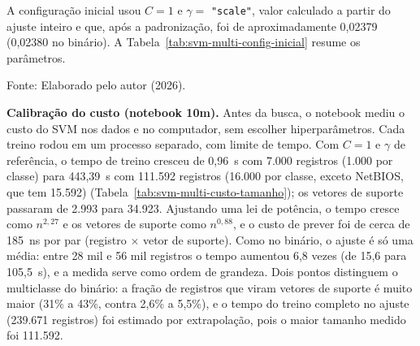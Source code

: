 \documentclass[
    12pt,                %
    openright,           %
    oneside,             %
    a4paper,             %
    english,             %
    brazil               %
]{abntex2}
\begin{document}
A configuração inicial usou $C = 1$ e $\gamma =$ \texttt{"scale"}, valor calculado a partir do ajuste inteiro e que, após a padronização, foi de aproximadamente 0,02379 (0,02380 no binário). A Tabela~\ref{tab:svm-multi-config-inicial} resume os parâmetros.
 
\begin{table}
\centering
\caption{Configuração inicial do SVM multiclasse}
\label{tab:svm-multi-config-inicial}
\par\smallskip
Fonte: Elaborado pelo autor (2026).
\end{table}
 
\textbf{Calibração do custo (notebook 10m).} Antes da busca, o notebook mediu o custo do SVM nos dados e no computador, sem escolher hiperparâmetros. Cada treino rodou em um processo separado, com limite de tempo. Com $C = 1$ e $\gamma$ de referência, o tempo de treino cresceu de 0,96~s com 7.000 registros (1.000 por classe) para 443,39~s com 111.592 registros (16.000 por classe, exceto NetBIOS, que tem 15.592) (Tabela~\ref{tab:svm-multi-custo-tamanho}); os vetores de suporte passaram de 2.993 para 34.923. Ajustando uma lei de potência, o tempo cresce como $n^{2{,}27}$ e os vetores de suporte como $n^{0{,}88}$, e o custo de prever foi de cerca de 185~ns por par (registro $\times$ vetor de suporte). Como no binário, o ajuste é só uma média: entre 28 mil e 56 mil registros o tempo aumentou 6,8 vezes (de 15,6 para 105,5~s), e a medida serve como ordem de grandeza. Dois pontos distinguem o multiclasse do binário: a fração de registros que viram vetores de suporte é muito maior (31\% a 43\%, contra 2,6\% a 5,5\%), e o tempo do treino completo no ajuste (239.671 registros) foi estimado por extrapolação, pois o maior tamanho medido foi 111.592.
 
\end{document}

